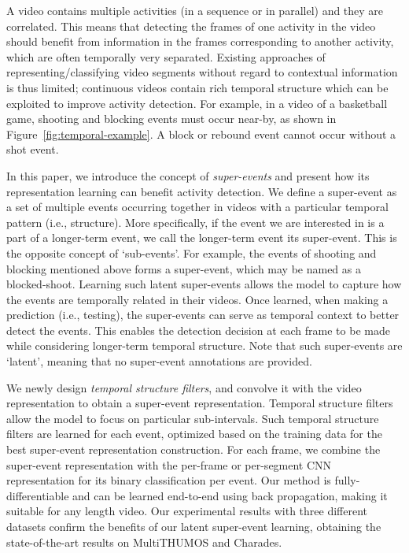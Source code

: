 \documentclass[10pt,twocolumn,letterpaper]{article}
\begin{document}
A video contains multiple activities (in a sequence or in parallel) and they are correlated. This means that detecting the frames of one activity in the video should benefit from information in the frames corresponding to another activity, which are often temporally very separated. Existing approaches of representing/classifying video segments without regard to contextual information is thus limited; continuous videos contain rich temporal structure which can be exploited to improve activity detection. For example, in a video of a basketball game, shooting and blocking events must occur near-by, as shown in Figure~\ref{fig:temporal-example}. A block or rebound event cannot occur without a shot event.



In this paper, we introduce the concept of \emph{super-events} and present how its representation learning can benefit activity detection. We define a super-event as a set of multiple events occurring together in videos with a particular temporal pattern (i.e., structure). More specifically, if the event we are interested in is a part of a longer-term event, we call the longer-term event its super-event. This is the opposite concept of `sub-events'. For example, the events of shooting and blocking mentioned above forms a super-event, which may be named as a blocked-shoot. Learning such latent super-events allows the model to capture how the events are temporally related in their videos. Once learned, when making a prediction (i.e., testing), the super-events can serve as temporal context to better detect the events. This enables the detection decision at each frame to be made while considering longer-term temporal structure. Note that such super-events are `latent', meaning that no super-event annotations are provided.



















We newly design \emph{temporal structure filters}, and convolve it with the video representation to obtain a super-event representation. Temporal structure filters allow the model to focus on particular sub-intervals. Such temporal structure filters are learned for each event, optimized based on the training data for the best super-event representation construction. For each frame, we combine the super-event representation with the per-frame or per-segment CNN representation for its binary classification per event.  Our method is fully-differentiable and can be learned end-to-end using back propagation, making it suitable for any length video. Our experimental results with three different datasets confirm the benefits of our latent super-event learning, obtaining the state-of-the-art results on MultiTHUMOS and Charades.
\end{document}
